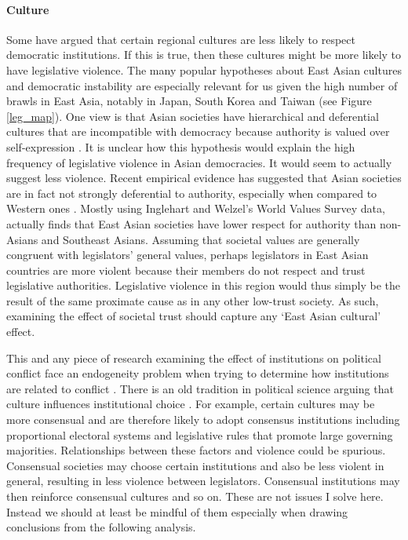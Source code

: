 \documentclass[a4paper]{article}\usepackage{graphicx, color}
\begin{document}
\paragraph{Culture}

Some have argued that certain regional cultures are less likely to respect democratic institutions. If this is true, then these cultures might be more likely to have legislative violence. The many popular hypotheses about East Asian cultures and democratic instability are especially relevant for us given the high number of brawls in East Asia, notably in Japan, South Korea and Taiwan (see Figure \ref{leg_map}). One view is that Asian societies have hierarchical and deferential cultures that are incompatible with democracy because authority is valued over self-expression \citep[see][212-213 for a discussion]{Dalton2005}. It is unclear how this hypothesis would explain the high frequency of legislative violence in Asian democracies. It would seem to actually suggest less violence. Recent empirical evidence has suggested that Asian societies are in fact not strongly deferential to authority, especially when compared to Western ones \citep{Dalton2005, KimAsianValues2010}. Mostly using Inglehart and Welzel's World Values Survey data, \cite{KimAsianValues2010} actually finds that East Asian societies have lower respect for authority than non-Asians and Southeast Asians. Assuming that societal values are generally congruent with legislators' general values, perhaps legislators in East Asian countries are more violent because their members do not respect and trust legislative authorities. Legislative violence in this region would thus simply be the result of the same proximate cause as in any other low-trust society. As such, examining the effect of societal trust should capture any `East Asian cultural' effect. 

This and any piece of research examining the effect of institutions on political conflict face an endogeneity problem when trying to determine how institutions are related to conflict \citep[][751]{Carey2000}. There is an old tradition in political science \citep[][528--529]{Frye1997} arguing that culture influences institutional choice \citep[in particular see][]{Almond1963}. For example, certain cultures may be more consensual and are therefore likely to adopt consensus institutions \citep[][22-23]{Lijphart2003} including proportional electoral systems and legislative rules that promote large governing majorities. Relationships between these factors and violence could be spurious. Consensual societies may choose certain institutions and also be less violent in general, resulting in less violence between legislators. Consensual institutions may then reinforce consensual cultures and so on. These are not issues I solve here. Instead we should at least be mindful of them especially when drawing conclusions from the following analysis.
\end{document}
